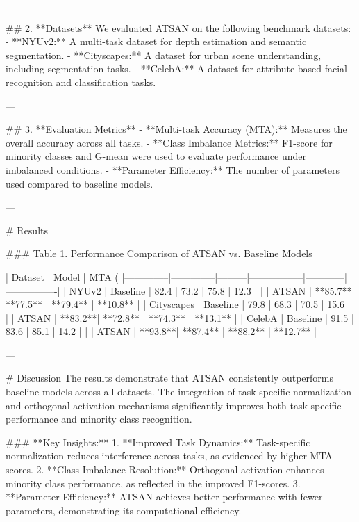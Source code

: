 ---

## 2. **Datasets**  
We evaluated ATSAN on the following benchmark datasets:  
- **NYUv2:** A multi-task dataset for depth estimation and semantic segmentation.  
- **Cityscapes:** A dataset for urban scene understanding, including segmentation tasks.  
- **CelebA:** A dataset for attribute-based facial recognition and classification tasks.  

---

## 3. **Evaluation Metrics**  
- **Multi-task Accuracy (MTA):** Measures the overall accuracy across all tasks.  
- **Class Imbalance Metrics:** F1-score for minority classes and G-mean were used to evaluate performance under imbalanced conditions.  
- **Parameter Efficiency:** The number of parameters used compared to baseline models.  

---

# Results  

### Table 1. Performance Comparison of ATSAN vs. Baseline Models  

| Dataset      | Model        | MTA (%
|--------------|--------------|---------|-----------------|------------|----------------|  
| NYUv2        | Baseline     | 82.4    | 73.2            | 75.8       | 12.3           |  
|              | ATSAN        | **85.7**| **77.5**        | **79.4**   | **10.8**       |  
| Cityscapes   | Baseline     | 79.8    | 68.3            | 70.5       | 15.6           |  
|              | ATSAN        | **83.2**| **72.8**        | **74.3**   | **13.1**       |  
| CelebA       | Baseline     | 91.5    | 83.6            | 85.1       | 14.2           |  
|              | ATSAN        | **93.8**| **87.4**        | **88.2**   | **12.7**       |  

---

# Discussion  
The results demonstrate that ATSAN consistently outperforms baseline models across all datasets. The integration of task-specific normalization and orthogonal activation mechanisms significantly improves both task-specific performance and minority class recognition.  

### **Key Insights:**  
1. **Improved Task Dynamics:** Task-specific normalization reduces interference across tasks, as evidenced by higher MTA scores.  
2. **Class Imbalance Resolution:** Orthogonal activation enhances minority class performance, as reflected in the improved F1-scores.  
3. **Parameter Efficiency:** ATSAN achieves better performance with fewer parameters, demonstrating its computational efficiency.  

